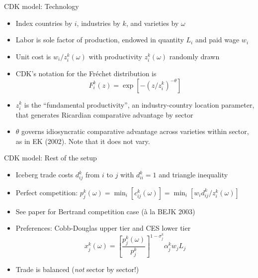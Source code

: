 \documentclass[11pt,notes=hide,aspectratio=169]{beamer}
\begin{document}
\begin{frame}{CDK model: Technology}
\begin{itemize}
	\item Index countries by $i$, industries by $k$, and varieties by $\omega$
	\item Labor is sole factor of production, endowed in quantity $L_i$ and paid wage $w_i$
	\item Unit cost is $w_i/z_i^k(\omega)$ with productivity $z_i^k(\omega)$ randomly drawn
	\item CDK's notation for the Fr\'{e}chet distribution is
	\begin{equation*}
		F_i^k(z) = \exp\left[-\left(z/z_i^k\right)^{-\theta}\right]
	\end{equation*}
	\item $z_i^k$ is the ``fundamental productivity'', an industry-country location parameter, that generates Ricardian comparative advantage by sector
	\item $\theta$ governs idiosyncratic comparative advantage across varieties within sector, as in EK (2002). Note that it does not vary.
\end{itemize}
\end{frame}
\begin{frame}{CDK model: Rest of the setup}
\begin{itemize}
	\item Iceberg trade costs $d_{ij}^k$ from $i$ to $j$ with $d_{ii}^k=1$ and triangle inequality
	\item Perfect competition: $p_{j}^k(\omega) = \min_i \left[c_{ij}^k(\omega)\right] = \min_i \left[w_i d_{ij}^k/z_i^k(\omega)\right] $
	\item See paper for Bertrand competition case (\`{a} la BEJK 2003)
	\item Preferences: Cobb-Douglas upper tier and CES lower tier
	\begin{equation*}
	x_j^k(\omega) = \left[\frac{p_j^k(\omega)}{p_j^k} \right]^{1-\sigma_j^k} \alpha_j^k w_j L_j
	\end{equation*}
	\item Trade is balanced (\textit{not} sector by sector!)
\end{itemize}
\end{frame}
\end{document}
